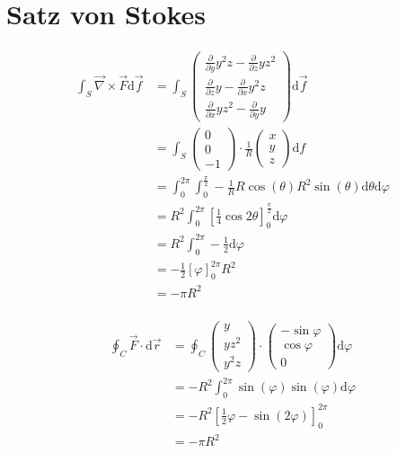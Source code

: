 \documentclass[sectionformat=aufgabe]{gadsescript}
\newcommand{\dd}{\text{d}}
\begin{document}
\maketitle

\section{Satz von Stokes}
\begin{align*}
	\int_{S}^{} \vec \nabla \times \vec F \dd \vec f &= \int _S \begin{pmatrix} \frac{ \partial }{ \partial y } y^2z - \frac{ \partial }{ \partial z } yz^2 \\ \frac{ \partial }{ \partial z } y - \frac{ \partial }{ \partial x } y^2 z \\ \frac{ \partial }{ \partial x } yz^2 - \frac{\partial}{ \partial y } y \end{pmatrix} \dd \vec f \\
	&= \int _S \begin{pmatrix} 0 \\ 0 \\ -1 \end{pmatrix} \cdot \frac{ 1 }{ R } \begin{pmatrix} x \\ y \\ z \end{pmatrix} \dd f \\
	&= \int_{0}^{2 \pi } \int_{0}^{\frac{ \pi }{ 2 } } - \frac{ 1 }{ R } R \cos ( \theta ) R^2 \sin ( \theta )  \dd \theta \dd \varphi \\
	&= R^2 \int_{0}^{2 \pi } \left[\frac{ 1 }{ 4 } \cos 2\theta\right]_{0} ^{\frac{ \pi }{ 2 } } \dd \varphi \\
	&= R^2 \int_{0}^{2 \pi } - \frac{ 1 }{ 2 }  \dd \varphi \\
	&= - \frac{ 1 }{ 2 } [\varphi]_{0} ^{2 \pi } R^2 \\
	&= - \pi R^2 \\
\end{align*}

\begin{align*}
	\oint_{C}^{} \vec F \cdot \dd \vec r &= \oint_{C}^{} \begin{pmatrix} y \\ yz^2 \\ y^2 z \end{pmatrix} \cdot \begin{pmatrix} -\sin \varphi \\ \cos \varphi \\ 0 \end{pmatrix}  \dd \varphi \\
	&= - R^2 \int_{0}^{2 \pi } \sin ( \varphi ) \sin (\varphi) \dd \varphi \\
	&= - R^2 \left[ \frac{ 1 }{ 2 } \varphi - \sin (2\varphi) \right]_{0} ^{2 \pi }  \\
	&= - \pi R^2 \\
\end{align*}
\end{document}
